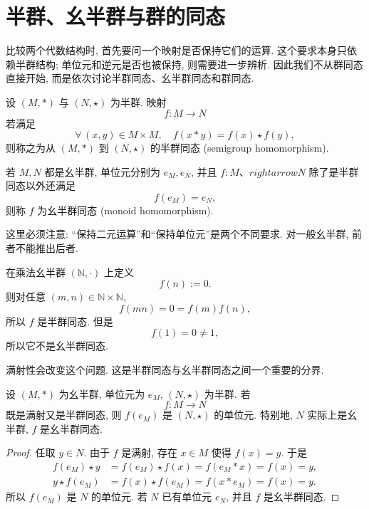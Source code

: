 \documentclass[usesamecnt, thmcnt=section, lang=cn, newtx, 10pt, scheme=chinese]{elegantbook}
\begin{document}
\section{半群、幺半群与群的同态}

比较两个代数结构时, 首先要问一个映射是否保持它们的运算. 这个要求本身只依赖半群结构; 单位元和逆元是否也被保持, 则需要进一步辨析. 因此我们不从群同态直接开始, 而是依次讨论半群同态、幺半群同态和群同态.

\begin{definition}[半群同态与幺半群同态]\label{def:alg-semigroup-monoid-hom}
设 $(M,*)$ 与 $(N,\star)$ 为半群. 映射
\[
 f:M\longrightarrow N
\]
若满足
\[
 \forall\,(x,y)\in M\times M,\quad f(x*y)=f(x)\star f(y),
\]
则称之为从 $(M,*)$ 到 $(N,\star)$ 的{\color{blue}半群同态 (semigroup homomorphism)}.

若 $M,N$ 都是幺半群, 单位元分别为 $e_M,e_N$, 并且 $f:M、rightarrow N$ 除了是半群同态以外还满足
\[
 f(e_M)=e_N,
\]
则称 $f$ 为{\color{blue}幺半群同态 (monoid homomorphism)}.
\end{definition}

这里必须注意: ``保持二元运算''和``保持单位元''是两个不同要求. 对一般幺半群, 前者不能推出后者.

\begin{instance}\label{ins:alg-semigroup-not-monoid-hom}
在乘法幺半群 $(\mathbb N,\cdot)$ 上定义
\[
 f(n):=0.
\]
则对任意 $(m,n)\in\mathbb N\times\mathbb N$,
\[
 f(mn)=0=f(m)f(n),
\]
所以 $f$ 是半群同态. 但是
\[
 f(1)=0\neq1,
\]
所以它不是幺半群同态.
\end{instance}

满射性会改变这个问题. 这是半群同态与幺半群同态之间一个重要的分界.

\begin{proposition}\label{prop:alg-surjective-semigroup-hom}
设 $(M,*)$ 为幺半群, 单位元为 $e_M$, $(N,\star)$ 为半群. 若
\[
 f:M\longrightarrow N
\]
既是满射又是半群同态, 则 $f(e_M)$ 是 $(N,\star)$ 的单位元. 特别地, $N$ 实际上是幺半群, $f$ 是幺半群同态.
\end{proposition}

\begin{proof}
任取 $y\in N$. 由于 $f$ 是满射, 存在 $x\in M$ 使得 $f(x)=y$. 于是
\[
 \begin{aligned}
 f(e_M)\star y
 &=f(e_M)\star f(x)
 =f(e_M*x)
 =f(x)
 =y,\\
 y\star f(e_M)
 &=f(x)\star f(e_M)
 =f(x*e_M)
 =f(x)
 =y.
 \end{aligned}
\]
所以 $f(e_M)$ 是 $N$ 的单位元. 若 $N$ 已有单位元 $e_N$, 并且 $f$ 是幺半群同态.
\end{proof}
\end{document}
